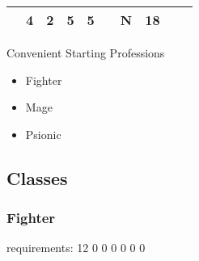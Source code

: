 \documentclass[12pt]{article}
\newcommand{\WviiTwoColumnSetup}{\raggedcolumns\RaggedRight}
\begin{document}
\begin{longtable}[]{@{}llllllllll@{}}
\begin{minipage}[t]{0.06\columnwidth}
\strut\end{minipage} &
\begin{minipage}[t]{0.06\columnwidth}\raggedright\strut
4
\strut\end{minipage} &
\begin{minipage}[t]{0.06\columnwidth}\raggedright\strut
2
\strut\end{minipage} &
\begin{minipage}[t]{0.06\columnwidth}\raggedright\strut
5
\strut\end{minipage} &
\begin{minipage}[t]{0.06\columnwidth}\raggedright\strut
5
\strut\end{minipage} &
\begin{minipage}[t]{0.06\columnwidth}\raggedright\strut
\strut\end{minipage} &
\begin{minipage}[t]{0.07\columnwidth}\raggedright\strut
N
\strut\end{minipage} &
\begin{minipage}[t]{0.08\columnwidth}\raggedright\strut
18
\strut\end{minipage}\tabularnewline
\bottomrule
\end{longtable}

Convenient Starting Professions

\begin{multicols}{2}\WviiTwoColumnSetup
\begin{itemize}
\item
  Fighter
\item
  Mage
\item
  Psionic
\end{itemize}
\end{multicols}

\subsection{Classes}\label{classes}

\subsubsection{Fighter}\label{fighter}

requirements: 12 0 0 0 0 0 0
\end{document}
